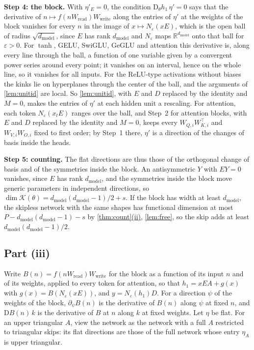 \documentclass[10pt]{article}
\theoremstyle{definition}
\theoremstyle{remark}
\newcommand{\R}{\mathbb{R}}
\newcommand{\Wread}{W_{\mathrm{read}}}
\newcommand{\Wwrite}{W_{\mathrm{write}}}
\newcommand{\dm}{d_{\mathrm{model}}}
\newcommand{\Der}{\mathrm{D}}
\newcommand{\para}[1]{\smallskip\noindent\textbf{#1}\hspace{0.5em}}
\DeclareRobustCommand{\cpref}[2]{\hyperref[#1:#2]{\cref*{#1}(#2)}}
\begin{document}
\para{Step 4: the block.} With $\eta'_E = 0$, the condition $\Der_\theta h_1\,\eta' = 0$ says that the derivative of $n \mapsto f(n\Wread)\Wwrite$ along the entries of $\eta'$ at the weights of the block vanishes for every $n$ in the image of $x \mapsto N_\varepsilon(xE)$, which is the open ball of radius $\sqrt{\dm}$, since $E$ has rank $\dm$ and $N_\varepsilon$ maps $\R^{\dm}$ onto that ball for $\varepsilon > 0$. For $\tanh$, GELU, SwiGLU, GeGLU and attention this derivative is, along every line through the ball, a function of one variable given by a convergent power series around every point; it vanishes on an interval, hence on the whole line, so it vanishes for all inputs. For the ReLU-type activations without biases the kinks lie on hyperplanes through the center of the ball, and the arguments of \cref{lem:unitid} are local. So \cref{lem:unitid}, with $E$ and $D$ replaced by the identity and $M = 0$, makes the entries of $\eta'$ at each hidden unit a rescaling. For attention, each token $N_\varepsilon(x_tE)$ ranges over the ball, and Step~2 for attention blocks, with $E$ and $D$ replaced by the identity and $M = 0$, keeps every $W_{Q,i}W_{K,i}^\top$ and $W_{V,i}W_{O,i}$ fixed to first order; by Step~1 there, $\eta'$ is a direction of the changes of basis inside the heads.

\para{Step 5: counting.} The flat directions are thus those of the orthogonal change of basis and of the symmetries inside the block. An antisymmetric $Y$ with $EY = 0$ vanishes, since $E$ has rank $\dm$, and the symmetries inside the block move generic parameters in independent directions, so $\dim\mathcal K(\theta) = \dm(\dm-1)/2 + s$. If the block has width at least $\dm$, the skipless network with the same shapes has functional dimension at most $P - \dm(\dm-1) - s$ by \cpref{thm:count}{ii}, \cref{lem:free}, so the skip adds at least $\dm(\dm-1)/2$.

\subsection*{Part (iii)}

Write $B(n) = f(n\Wread)\Wwrite$ for the block as a function of its input $n$ and of its weights, applied to every token for attention, so that $h_1 = xEA + g(x)$ with $g(x) = B(N_\varepsilon(xE))$, and $y = N_\varepsilon(h_1)D$. For a direction $\psi$ of the weights of the block, $\partial_\psi B(n)$ is the derivative of $B(n)$ along $\psi$ at fixed $n$, and $\Der B(n)\,k$ is the derivative of $B$ at $n$ along $k$ at fixed weights. Let $\eta$ be flat. For an upper triangular $A$, view the network as the network with a full $A$ restricted to triangular skips: its flat directions are those of the full network whose entry $\eta_A$ is upper triangular.
\end{document}

